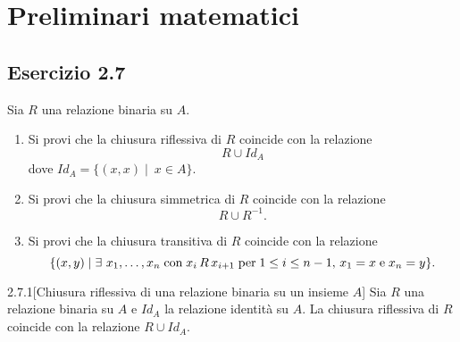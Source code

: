 \chapter{Preliminari matematici}
\label{chap:parte1}

\section*{Esercizio 2.7}
{}
\label{es:2.7}

\begin{tcolorbox} \cite{mssc2016} 
Sia $R$ una relazione binaria su $A$.
\begin{enumerate}
\item Si provi che la chiusura riflessiva di $R$ coincide con la relazione\[
	R \cup Id_A
\]
dove $Id_A = \{ (x, x) \mid \ x \in A \}$.
\item Si provi che la chiusura simmetrica di $R$ coincide con la relazione \[
	R \cup R^{-1}.
\]
\item Si provi che la chiusura transitiva di $R$ coincide con la relazione \[
	\{(x, y) \mid
	\exists \ x_1, \ldots, x_n 
	\; \text{con} \; x_i \, R \, x_{i+1} \; \text{per} \; 1 \leq i \leq n-1 \text{,} 
	\ x_1 = x \; \text{e} \; x_n = y 
	\}.
\]
\end{enumerate}
\end{tcolorbox}

\begin{customthm}{2.7.1}[Chiusura riflessiva di una relazione binaria su un insieme $A$]
\label{th:2.7.1}
Sia $R$ una relazione binaria su $A$ e $Id_A$ la relazione identità su $A$.
La chiusura riflessiva di $R$ coincide con la relazione $R \cup Id_A$.
\end{customthm}

